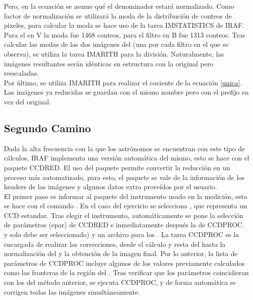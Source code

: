 \documentclass[12pt]{article}
\begin{document}
Pero, en la ecuación se asume qué el denominador estará normalizado. Como factor de normalización se utilizará la moda de la distribución de conteos de pixeles, para calcular la moda se hace uso de la tarea IMSTATISTICS de IRAF. Para el  en V la moda fue 1468 conteos, para el filtro en B fue 1313 conteos. Tras calcular las modas de las dos imágenes del  (una por cada filtro en el que se observa), se utiliza la tarea IMARITH para la división. Naturalmente, las imágenes resultantes serán idénticas en estructura con la original pero reescaladas.\\

Por último, se utiliza IMARITH para realizar el cociente de la ecuación \ref{unica}. Las imágenes ya reducidas se guardan con el mismo nombre pero con el prefijo  en vez del  original.

\subsection{Segundo Camino}
Dada la alta frecuencia con la que los astrónomos se encuentran con este tipo de cálculos, IRAF implementa una versión automática del mismo, esto se hace con el paquete CCDRED. El uso del paquete permite convertir la reducción en un proceso más automatizado, para esto, el paquete se vale de la información de los headers de las imágenes y algunos datos extra proveídos por el usuario.\\

El primer paso es informar al paquete del instrumento usado en la medición, esto se hace con el comando . En el caso del ejercicio se selecciona , que representa un CCD estandar. Tras elegir el instrumento, automáticamente se pone la selección de parámetros (epar) de CCDRED e inmediatamente después la de CCDPROC.  y solo debe ser seleccionado) y un archivo para los . La tarea CCDPROC es la encargada de realizar las correcciones, desde el cálculo y resta del  hasta la normalización del  y la obtención de la imagen final. Por lo anterior, la lista de parámetros de CCDPROC incluye algunos de los valores previamente calculados como las fronteras de la región del . Tras verificar que los parámetros coincidieran con los del método anterior, se ejecuta CCDPROC, y de forma automática se corrigen todas las imágenes simultáneamente. 
















{}

\end{document}
